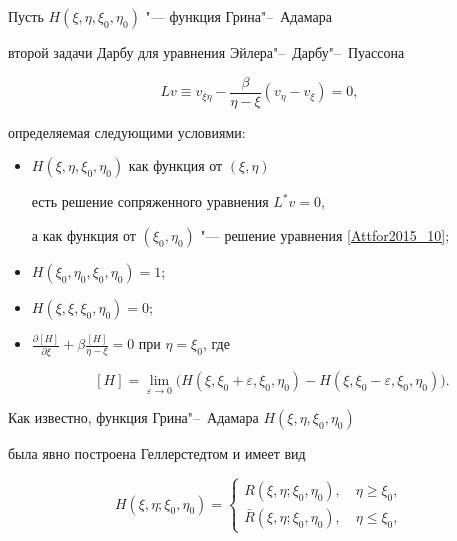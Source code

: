 Пусть $H(\xi,\eta,\xi_0,\eta_0)$ "--- функция Грина"--~Адамара

 второй задачи Дарбу для уравнения Эйлера"--~Дарбу"--~Пуассона

\begin{equation}

\label{Attfor2015_12}

Lv\equiv v_{\xi\eta}-\frac{\beta}{\eta-\xi}(v_\eta-v_\xi)=0,

\end{equation}

определяемая следующими условиями:

\begin{itemize}

\item[1)] $H(\xi, \eta, \xi_0, \eta_0)$ как функция от  $(\xi,\eta)$

 есть решение сопряженного уравнения  $L^*v=0$, 

 а как функция от  $(\xi_0,\eta_0)$ "--- решение уравнения \eqref{Attfor2015_10};



\item[ 2)] $H(\xi_0,\eta_0,\xi_0,\eta_0)=1$;



\item[ 3)] $H(\xi,\xi,\xi_0,\eta_0)=0$;



\item[ 4)] $\displaystyle \frac{\partial[H]}{\partial\xi}+\beta\frac{[H]}{\eta-\xi}=0$ при $\eta=\xi_0$, где

$$

[H]=\lim\limits_{\varepsilon\rightarrow 0}\bigl(H(\xi,\xi_0+\varepsilon,\xi_0,\eta_0)

-H(\xi,\xi_0-\varepsilon,\xi_0,\eta_0)\bigr).

$$



\end{itemize}





Как известно, функция Грина"--~Адамара $H(\xi,\eta,\xi_0,\eta_0)$ 

была явно построена Геллерстедтом \cite{Attfor2015_lit_02} и имеет вид

\begin{displaymath}

H(\xi,\eta;\xi_0,\eta_0) = 

\left\{ \begin{array}{ll}

R(\xi,\eta;\xi_0,\eta_0), \quad \eta\geqslant\xi_0,\\

\bar{R}(\xi,\eta;\xi_0,\eta_0), \quad \eta\leqslant\xi_0,

\end{array} \right.

\end{displaymath}


